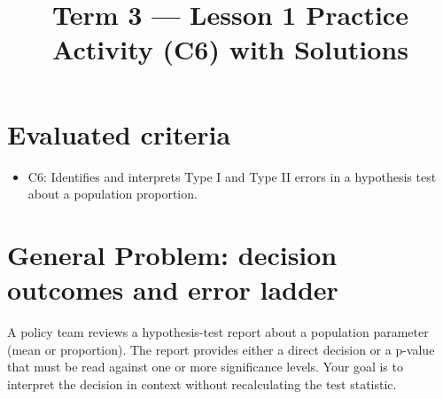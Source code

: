 \newcommand{\TwoTailGraph}[3]{%
	\begin{tikzpicture}[x=0.9cm,y=3.0cm]
		\NormalBase
		\fill[blue!20,domain=-3.2:-#1] (-3.2,0) -- plot[samples=90] (\x,{0.4*exp(-\x*\x/2)}) -- (-#1,0) -- cycle;
		\fill[blue!20,domain=#1:3.2] (#1,0) -- plot[samples=90] (\x,{0.4*exp(-\x*\x/2)}) -- (3.2,0) -- cycle;
		\def\ObsColor{black}
		\if\relax\detokenize{#2}\relax\else
		\pgfmathtruncatemacro{\RejectFlag}{#1>=#2}
		\ifnum\RejectFlag=1
		\def\ObsColor{green!60!black}
		\else
		\def\ObsColor{red}
		\fi
		\draw[dashed] (#2,0) -- (#2,{0.4*exp(-#2*#2/2)});
		\draw[dashed] (-#2,0) -- (-#2,{0.4*exp(-#2*#2/2)});
		\node[below] at (#2,-0.05) {\scriptsize $z_{\alpha/2}=#2$};
		\fi
		\draw[\ObsColor,dashed] (-#1,0) -- (-#1,{0.4*exp(-#1*#1/2)});
		\draw[\ObsColor,dashed] (#1,0) -- (#1,{0.4*exp(-#1*#1/2)});
		\node[above,text=\ObsColor] at (#1,{0.4*exp(-#1*#1/2)}) {\scriptsize $|z_{obs}|=#1$};
		\node at (0,0.46) {\scriptsize #3};
	\end{tikzpicture}%
}


\title{Term 3 --- Lesson 1 Practice Activity (C6) with Solutions}
\author{}
\date{}


	
	\maketitle
	
	\setcounter{tocdepth}{1}
	\setcounter{secnumdepth}{2}
	\tableofcontents
	
	\section*{Evaluated criteria}
	\begin{itemize}
		\item C6: Identifies and interprets Type I and Type II errors in a hypothesis test about a population proportion.
	\end{itemize}
	
	\section{General Problem: decision outcomes and error ladder}
	A policy team reviews a hypothesis-test report about a population parameter (mean or proportion). The report provides either a direct decision or a p-value that must be read against one or more significance levels. Your goal is to interpret the decision in context without recalculating the test statistic.
	
